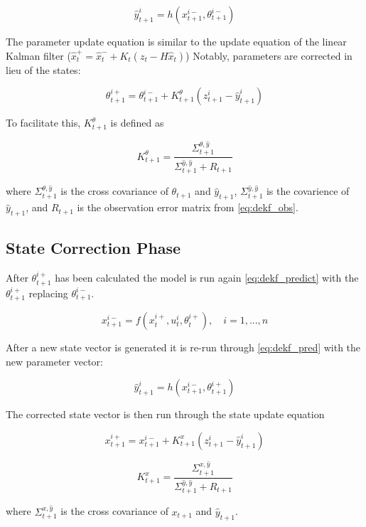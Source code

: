 \begin{equation}\label{eq:dekf_pred}
\hat{y}_{t+1}^{i} = h(x_{t+1}^{i-}, \theta_{t+1}^{i-})
\end{equation}

The parameter update equation is similar to the update equation of the linear Kalman filter ($\hat{x}^{+}_{t} = \hat{x}^{-}_{t} + K_{t}(z_{t}-H\hat{x}_{t})$) Notably,  parameters are corrected in lieu of the states:

\begin{equation}\label{eq:dekf_param_update}
\theta_{t+1}^{i+} = \theta_{t+1}^{i-} + K_{t+1}^{\theta}(z_{t+1}^{i}-\hat{y}_{t+1}^{i})
\end{equation}

To facilitate this, $K_{t+1}^{\theta}$ is defined as

\begin{equation}\label{eq:dekf_param_k}
K_{t+1}^{\theta} = \frac{\Sigma^{\theta,\hat{y}}_{t+1}}{\Sigma^{\hat{y},\hat{y}}_{t+1} + R_{t+1}}
\end{equation}

where $\Sigma^{\theta,\hat{y}}_{t+1}$ is the cross covariance of $\theta_{t+1}$ and $\hat{y}_{t+1}$, $\Sigma^{\hat{y},\hat{y}}_{t+1}$ is the covarience of $\hat{y}_{t+1}$, and $R_{t+1}$ is the observation error matrix from \eqref{eq:dekf_obs}. 

\subsection{State Correction Phase}

After $\theta_{t+1}^{i+}$ has been calculated the model is run again \eqref{eq:dekf_predict} with the $\theta_{t+1}^{i+}$ replacing $\theta_{t+1}^{i-}$.

\begin{equation}\label{eq:dekf_predict_2}
x_{t+1}^{i-} = f(x_{t}^{i+}, u_{t}^{i}, \theta^{i+}_{t}), \quad i=1,...,n
\end{equation}

After a new state vector is generated it is re-run through \eqref{eq:dekf_pred} with the new parameter vector:

\begin{equation}\label{eq:dekf_pred_2}
\hat{y}_{t+1}^{i} = h(x_{t+1}^{i-}, \theta_{t+1}^{i+})
\end{equation}

The corrected state vector is then run through the state update equation

\begin{equation}\label{eq:dekf_state_update}
x_{t+1}^{i+} = x_{t+1}^{i-} + K_{t+1}^{x}(z_{t+1}^{i}-\hat{y}_{t+1}^{i})
\end{equation}
 
\begin{equation}\label{eq:dekf_param_k}
K_{t+1}^{x} = \frac{\Sigma^{x,\hat{y}}_{t+1}}{\Sigma^{\hat{y},\hat{y}}_{t+1} + R_{t+1}}
\end{equation}

where $\Sigma^{x,\hat{y}}_{t+1}$ is the cross covariance of $x_{t+1}$ and $\hat{y}_{t+1}$.



